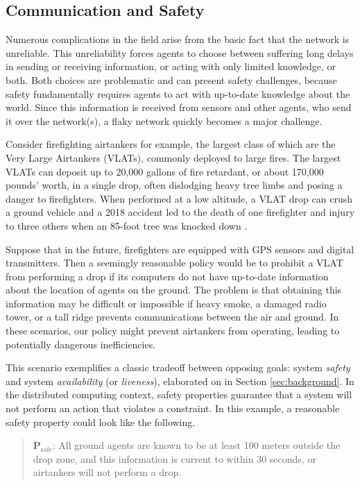 \documentclass[]             %
{NASA}                       %
\theoremstyle{definition}
\begin{document}
\hypertarget{communication-and-safety}{%
\subsection{Communication and Safety}\label{communication-and-safety}}

Numerous complications in the field arise from the basic fact that the
network is unreliable. This unreliability forces agents to choose
between suffering long delays in sending or receiving information, or
acting with only limited knowledge, or both. Both choices are
problematic and can present safety challenges, because safety
fundamentally requires agents to act with up-to-date knowledge about
the world. Since this information is received from sensors and other
agents, who send it over the network(s), a flaky network quickly
becomes a major challenge.

Consider firefighting airtankers for example, the largest class of which
are the Very Large Airtankers (VLATs), commonly deployed to large fires.
The largest VLATs can deposit up to 20,000 gallons of fire retardant, or
about 170,000 pounds' worth, in a single drop, often dislodging heavy
tree limbs and posing a danger to firefighters. When performed at a low
altitude, a VLAT drop can crush a ground vehicle \cite{2019:stickney}
and a 2018 accident led to the death of one firefighter and injury to
three others when an 85-foot tree was knocked down \cite{2018:calfire}.

Suppose that in the future, firefighters are equipped with GPS sensors
and digital transmitters. Then a seemingly reasonable policy would be to
prohibit a VLAT from performing a drop if its computers do not have
up-to-date information about the location of agents on the ground. The
problem is that obtaining this information may be difficult or
impossible if heavy smoke, a damaged radio tower, or a tall ridge
prevents communications between the air and ground. In these scenarios,
our policy might prevent airtankers from operating, leading to
potentially dangerous inefficiencies.

This scenario exemplifies a classic tradeoff between opposing goals:
system \emph{safety} and system \emph{availability} (or
\emph{liveness}), elaborated on in Section \ref{sec:background}. In the
distributed computing context, safety properties guarantee that a system
will not perform an action that violates a constraint. In this example,
a reasonable safety property could look like the following.

\begin{quote}
    $\textbf{P}_\textrm{safe}$: All ground agents are
known to be at least 100 meters outside the drop zone, and this
information is current to within 30 seconds, or airtankers will not perform a
drop.
\end{quote}
\end{document}
